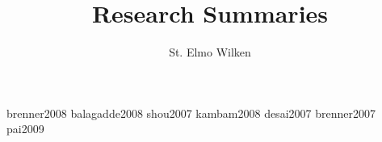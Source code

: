 \documentclass[11pt,fleqn]{article}
\begin{document}
\title{Research Summaries}
\author{St. Elmo Wilken}
\maketitle

{brenner2008}
{balagadde2008}
{shou2007}
{kambam2008}
{desai2007}
{brenner2007}
{pai2009}




\end{document}

